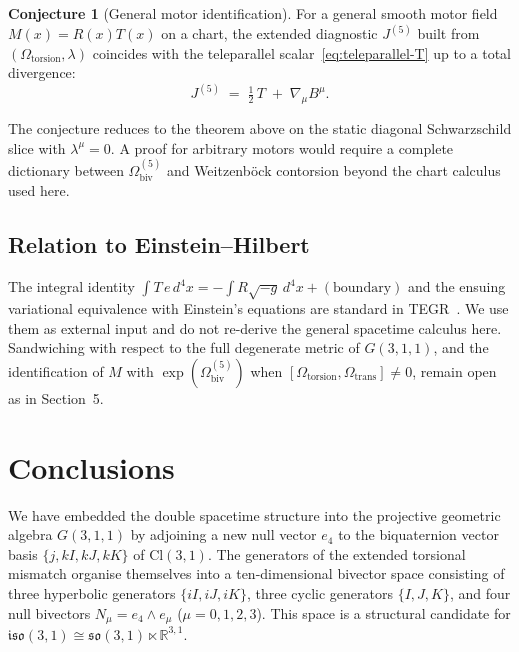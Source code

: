 \documentclass[dvipdfmx,a4paper]{article}
\theoremstyle{definition}
\newtheorem{conjecture}{Conjecture}
\theoremstyle{plain}
\theoremstyle{remark}
\begin{document}
\begin{conjecture}[General motor identification]
For a general smooth motor field \(M(x)=R(x)T(x)\) on a chart, the extended diagnostic \(J^{(5)}\) built from \((\Omega_{\mathrm{torsion}},\lambda)\) coincides with the teleparallel scalar~\eqref{eq:teleparallel-T} up to a total divergence:
\begin{equation}
J^{(5)} \;=\; \tfrac12\, T \;+\; \nabla_{\mu}B^{\mu}.
\label{eq:J5-T-conjecture}
\end{equation}
\end{conjecture}

The conjecture reduces to the theorem above on the static diagonal Schwarzschild slice with \(\lambda^{\mu}=0\). A proof for arbitrary motors would require a complete dictionary between \(\Omega_{\mathrm{biv}}^{(5)}\) and Weitzenb\"{o}ck contorsion beyond the chart calculus used here.

\subsection{Relation to Einstein--Hilbert}

The integral identity \(\int T\,e\,d^{4}x=-\int R\sqrt{-g}\,d^{4}x+(\text{boundary})\) and the ensuing variational equivalence with Einstein's equations are standard in TEGR~\cite{maluf2013}. We use them as external input and do not re-derive the general spacetime calculus here. Sandwiching with respect to the full degenerate metric of \(G(3,1,1)\), and the identification of \(M\) with \(\exp(\Omega_{\mathrm{biv}}^{(5)})\) when \([\Omega_{\mathrm{torsion}},\Omega_{\mathrm{trans}}]\neq0\), remain open as in Section~5.

\section{Conclusions}

We have embedded the double spacetime structure into the projective geometric algebra \(G(3,1,1)\) by adjoining a new null vector \(e_{4}\) to the biquaternion vector basis \(\{j, kI, kJ, kK\}\) of \(\mathrm{Cl}(3,1)\). The generators of the extended torsional mismatch organise themselves into a ten-dimensional bivector space consisting of three hyperbolic generators \(\{iI,iJ,iK\}\), three cyclic generators \(\{I,J,K\}\), and four null bivectors \(N_{\mu}=e_{4}\wedge e_{\mu}\) (\(\mu=0,1,2,3\)). This space is a structural candidate for \(\mathfrak{iso}(3,1)\cong\mathfrak{so}(3,1)\ltimes\mathbb{R}^{3,1}\).
\end{document}
